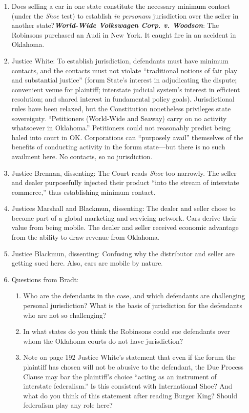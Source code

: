 \begin{enumerate}
    \item Does selling a car in one state constitute the necessary minimum contact (under the \emph{Shoe} test) to establish \emph{in personam} jurisdiction over the seller in another state?\textbf{\emph{World-Wide Volkswagen Corp. v. Woodson}}: The Robinsons purchased an Audi in New York. It caught fire in an accident in Oklahoma.    
    \item Justice White: To establish jurisdiction, defendants must have minimum contacts, and the contacts must not violate ``traditional notions of fair play and substantial justice'' (forum State's interest in adjudicating the dispute; convenient venue for plaintiff; interstate judicial system's interest in efficient resolution; and shared interest in fundamental policy goals). Jurisdictional rules have been relaxed, but the Constitution nonetheless privileges state sovereignty. ``Petitioners (World-Wide and Seaway) carry on no activity whatsoever in Oklahoma.'' Petitioners could not reasonably predict being haled into court in OK. Corporations can ``purposely avail'' themselves of the benefits of conducting activity in the forum state---but there is no such availment here. No contacts, so no jurisdiction.
    \item Justice Brennan, dissenting: The Court reads \emph{Shoe} too narrowly. The seller and dealer purposefully injected their product ``into the stream of interstate commerce,'' thus establishing minimum contact.
    \item Justices Marshall and Blackmun, dissenting: The dealer and seller chose to become part of a global marketing and servicing network. Cars derive their value from being mobile. The dealer and seller received economic advantage from the ability to draw revenue from Oklahoma.
    \item Justice Blackmun, dissenting: Confusing why the distributor and seller are getting sued here. Also, cars are mobile by nature.
    \item Questions from Bradt:
    \begin{enumerate}
        \item Who are the defendants in the case, and which defendants are challenging personal jurisdiction? What is the basis of jurisdiction for the defendants who are not so challenging?
        \item In what states do you think the Robinsons could sue defendants over whom the Oklahoma courts do not have jurisdiction?
        \item Note on page 192 Justice White's statement that even if the forum the plaintiff has chosen will not be abusive to the defendant, the Due Process Clause may bar the plaintiff's choice ``acting as an instrument of interstate federalism.''  Is this consistent with International Shoe?  And what do you think of this statement after reading Burger King?  Should federalism play any role here?

\end{enumerate}
\end{enumerate}
